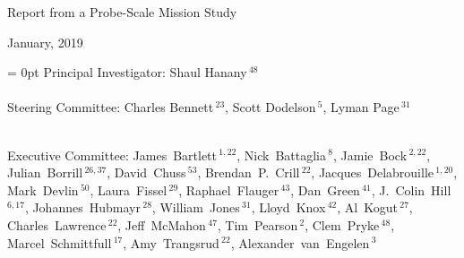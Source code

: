 \documentclass[PICOReport.tex]{subfiles}
\begin{document}
%
%
%
%
\Large{ \centerline{Report from a Probe-Scale Mission Study}}
\large{ \centerline{January, 2019 }}
\vspace{3pt}

\parindent = 0pt
\small{
Principal Investigator: Shaul Hanany\,$^{48}$ } \\
\vspace{-7pt} \\
\small{
Steering Committee: Charles Bennett\,$^{23}$, Scott Dodelson\,$^{5}$, Lyman Page\,$^{31}$ } \\
\vspace{-7pt} \\
\small{
\raggedright
Executive Committee:
James~Bartlett\,$^{1,22}$,
Nick~Battaglia\,$^{8}$,
Jamie~Bock\,$^{2,22}$,
Julian~Borrill\,$^{26,37}$,
David~Chuss\,$^{53}$,
Brendan~P.~Crill\,$^{22}$,
Jacques~Delabrouille\,$^{1,20}$,
Mark~Devlin\,$^{50}$,
Laura~Fissel\,$^{29}$,
Raphael~Flauger\,$^{43}$,
Dan~Green\,$^{41}$,
J.~Colin~Hill\,$^{6,17}$,
Johannes~Hubmayr\,$^{28}$,
William~Jones\,$^{31}$,
Lloyd~Knox\,$^{42}$,
Al~Kogut\,$^{27}$,
Charles~Lawrence\,$^{22}$,
Jeff~McMahon\,$^{47}$,
Tim~Pearson\,$^{2}$,
Clem~Pryke\,$^{48}$,
Marcel~Schmittfull\,$^{17}$,
Amy~Trangsrud\,$^{22}$,
Alexander~van~Engelen\,$^3$ \\
}

\label{authorlist}
\end{document}
